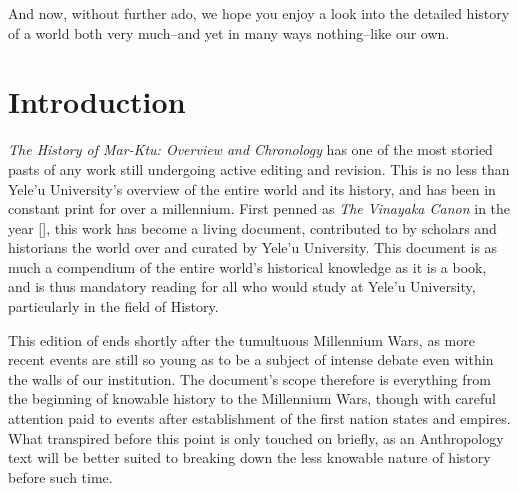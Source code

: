 		And now, without further ado, we hope you enjoy a look into the detailed history of a world both very much--and yet in many ways nothing--like our own. \par
		
		\clearpage  
\restoregeometry
\tableofcontents
\newpage
\thispagestyle{plain}
\chapter*{Introduction}
\label{chap:intro}
	\textit{The History of Mar-Ktu: Overview and Chronology} has one of the most storied pasts of any work still undergoing active editing and revision. This is no less than Yele'u University's overview of the entire world and its history, and has been in constant print for over a millennium. First penned as \textit{The Vinayaka Canon} in the year [], this work has become a living document, contributed to by scholars and historians the world over and curated by Yele'u University. This document is as much a compendium of the entire world's historical knowledge as it is a book, and is thus mandatory reading for all who would study at Yele'u University, particularly in the field of History.\par 
	This edition of  ends shortly after the tumultuous Millennium Wars, as more recent events are still so young as to be a subject of intense debate even within the walls of our institution. The document's scope therefore is everything from the beginning of knowable history to the Millennium Wars, though with careful attention paid to events after establishment of the first nation states and empires. What transpired before this point is only touched on briefly, as an Anthropology text will be better suited to breaking down the less knowable nature of history before such time.
\clearpage
